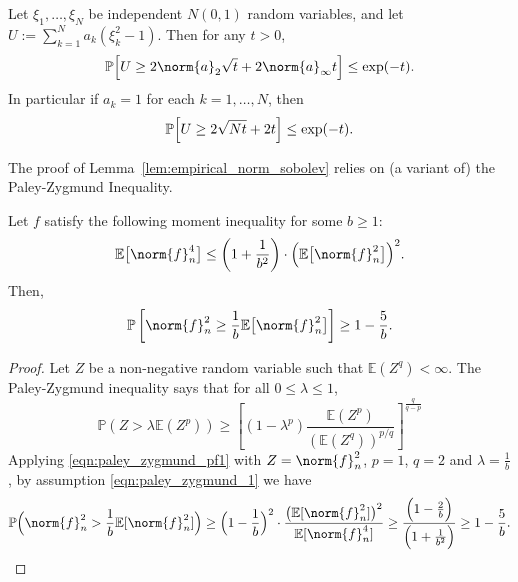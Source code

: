 \label{sec:concentration}
\begin{lemma}
	\label{lem:chi_square_bound}
	Let $\xi_1,\ldots,\xi_N$ be independent $N(0,1)$ random variables, and let $U := \sum_{k = 1}^{N} a_k(\xi_k^2 - 1)$.  Then for any $t > 0$,
	\begin{equation*}
	\Pbb\Bigl[U \geq 2 \norm{a}_2 \sqrt{t} + 2 \norm{a}_{\infty}t\Bigr] \leq \exp(-t).
	\end{equation*}
	In particular if $a_k = 1$ for each $k = 1,\ldots,N$, then
	\begin{equation*}
	\mathbb{P}\Bigl[U\geq 2\sqrt{N t} + 2t\Bigr] \leq \exp(-t).
	\end{equation*}
\end{lemma}

The proof of Lemma~\ref{lem:empirical_norm_sobolev} relies on (a variant of) the Paley-Zygmund Inequality.
\begin{lemma}
	\label{lem:paley_zygmund}
	Let $f$ satisfy the following moment inequality for some $b \geq 1$:
	\begin{equation}
	\label{eqn:paley_zygmund_1}
	\Ebb\bigl[\norm{f}_n^4\bigr] \leq \left(1 + \frac{1}{b^2}\right)\cdot\Bigl(\Ebb\bigl[\norm{f}_n^2\bigr]\Bigr)^2.
	\end{equation}
	Then,
	\begin{equation}
	\label{eqn:paley_zygmund_2}
	\mathbb{P}\left[\norm{f}_n^2 \geq \frac{1}{b} \Ebb\bigl[\norm{f}_n^2\bigr]\right] \geq 1 - \frac{5}{b}.
	\end{equation}
\end{lemma}
\begin{proof}
	Let $Z$ be a non-negative random variable such that $\mathbb{E}(Z^q) < \infty$. The Paley-Zygmund inequality says that for all $0 \leq \lambda \leq 1$,
	\begin{equation}
	\label{eqn:paley_zygmund_pf1}
	\mathbb{P}(Z > \lambda \mathbb{E}(Z^p)) \geq \left[(1 - \lambda^p) \frac{\mathbb{E}(Z^p)}{(\mathbb{E}(Z^q))^{p/q}}\right]^{\frac{q}{q - p}}
	\end{equation}
	Applying \eqref{eqn:paley_zygmund_pf1} with $Z = \norm{f}_n^2$, $p = 1$, $q = 2$ and $\lambda = \frac{1}{b}$, by assumption \eqref{eqn:paley_zygmund_1} we have
	\begin{equation*}
	\mathbb{P}\Bigl(\norm{f}_n^2 > \frac{1}{b} \mathbb{E}[\norm{f}_n^2]\Bigr) \geq \Bigl(1 - \frac{1}{b}\Bigr)^2 \cdot  \frac{\bigl(\mathbb{E}[\norm{f}_n^2]\bigr)^2}{\mathbb{E}[\norm{f}_n^4]} \geq \frac{\Bigl(1 - \frac{2}{b}\Bigr)}{\Bigl(1 + \frac{1}{b^2}\Bigr)} \geq 1 - \frac{5}{b}.
	\end{equation*}
\end{proof}

